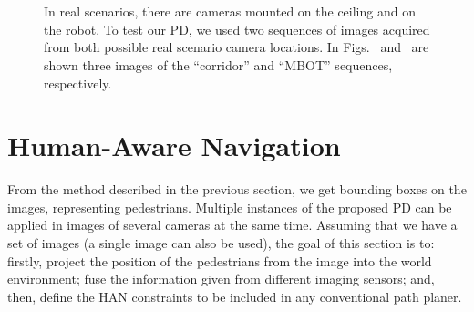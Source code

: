 \documentclass[5p,time]{elsarticle}
\begin{document}
\begin{figure*}
	\vspace{-0.25cm}
	\centering
	\\
	\\
	\caption{In real scenarios, there are cameras mounted on the ceiling and on the robot. To test our PD, we used two sequences of images acquired from both possible real scenario camera locations. In Figs.~\protect{} and~\protect{} are shown three images of the ``corridor'' and ``MBOT'' sequences, respectively.}
	\label{fig:david-results}
\end{figure*}



\section{Human-Aware Navigation}
\label{sec:used-constraints}
From the method described in the previous section, we get bounding boxes on the images, representing pedestrians. Multiple instances of the proposed PD can be applied in images of several cameras at the same time. Assuming that we have a set of images (a single image can also be used), the goal of this section is to: firstly, project the position of the pedestrians from the image into the world environment; fuse the information given from different imaging sensors; and, then, define the HAN constraints to be included in any conventional path planer.
\end{document}
